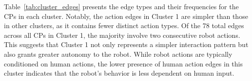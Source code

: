 \documentclass[letterpaper]{article} %
\begin{document}
\begin{table}[tb]
    \centering
    \renewcommand{\arraystretch}{1.2}
    \caption{Cluster statistics (higher is better for success rate and lower is better for the others.), with differences from the mean in parentheses.}
    \label{tab:cluster_stats}
\end{table}

Table~\ref{tab:cluster_edges} presents the edge types and their frequencies for the CPs in each cluster. Notably, the action edges in Cluster 1 are simpler than those in other clusters, as it contains fewer distinct action types. Of the 78 total edges across all CPs in Cluster 1, the majority involve two consecutive robot actions. This suggests that Cluster 1 not only represents a simpler interaction pattern but also grants greater autonomy to the robot. While robot actions are typically conditioned on human actions, the lower presence of human action edges in this cluster indicates that the robot's behavior is less dependent on human input.
\end{document}
